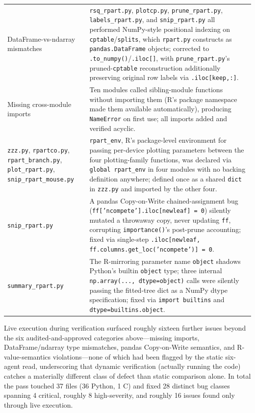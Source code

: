 \documentclass[12pt]{article}
\begin{document}
\begin{longtable}{p{2.6cm}p{9.9cm}}
DataFrame-vs-ndarray mismatches & \texttt{rsq\_rpart.py}, \texttt{plotcp.py}, \texttt{prune\_rpart.py}, \texttt{labels\_rpart.py}, and \texttt{snip\_rpart.py} all performed NumPy-style positional indexing on \texttt{cptable}/\texttt{splits}, which \texttt{rpart.py} constructs as \texttt{pandas.DataFrame} objects; corrected to \texttt{.to\_numpy()}/\texttt{.iloc[]}, with \texttt{prune\_rpart.py}'s pruned-\texttt{cptable} reconstruction additionally preserving original row labels via \texttt{.iloc[keep,:]}. \\
Missing cross-module imports & Ten modules called sibling-module functions without importing them (R's package namespace made them available automatically), producing \texttt{NameError} on first use; all imports added and verified acyclic. \\
\texttt{zzz.py}, \texttt{rpartco.py}, \texttt{rpart\_branch.py}, \texttt{plot\_rpart.py}, \texttt{snip\_rpart\_mouse.py} & \texttt{rpart\_env}, R's package-level environment for passing per-device plotting parameters between the four plotting-family functions, was declared via \texttt{global rpart\_env} in four modules with no backing definition anywhere; defined once as a shared \texttt{dict} in \texttt{zzz.py} and imported by the other four. \\
\texttt{snip\_rpart.py} & A pandas Copy-on-Write chained-assignment bug (\texttt{ff['ncompete'].iloc[newleaf] = 0}) silently mutated a throwaway copy, never updating \texttt{ff}, corrupting \texttt{importance()}'s post-prune accounting; fixed via single-step \texttt{.iloc[newleaf, ff.columns.get\_loc('ncompete')] = 0}. \\
\texttt{summary\_rpart.py} & The R-mirroring parameter name \texttt{object} shadows Python's builtin \texttt{object} type; three internal \texttt{np.array(..., dtype=object)} calls were silently passing the fitted-tree dict as a NumPy dtype specification; fixed via \texttt{import builtins} and \texttt{dtype=builtins.object}. \\
\end{longtable}

Live execution during verification surfaced roughly sixteen further issues beyond the six audited-and-approved categories above---missing imports, DataFrame/ndarray type mismatches, pandas Copy-on-Write semantics, and R-value-semantics violations---none of which had been flagged by the static six-agent read, underscoring that dynamic verification (actually running the code) catches a materially different class of defect than static comparison alone. In total the pass touched 37 files (36 Python, 1 C) and fixed 28 distinct bug classes spanning 4 critical, roughly 8 high-severity, and roughly 16 issues found only through live execution.
\end{document}

